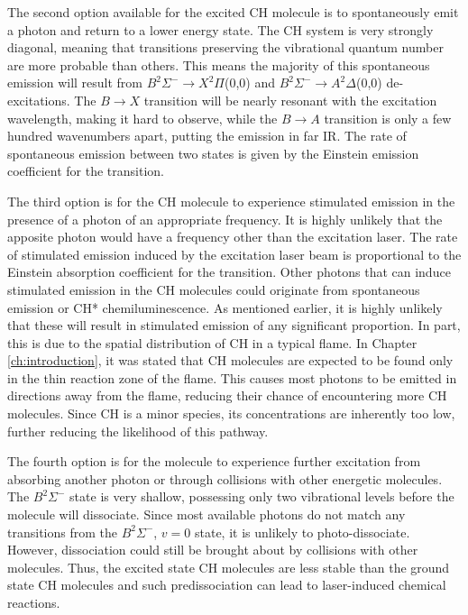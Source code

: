 The second option available for the excited CH molecule is to spontaneously emit a photon and return to a lower energy state.
The CH system is very strongly diagonal, meaning that transitions preserving the vibrational quantum number are more probable than others.
This means the majority of this spontaneous emission will result from \(B^2\Sigma^-\rightarrow X^2\Pi\)(0,0) and \(B^2\Sigma^-\rightarrow A^2\Delta\)(0,0) de-excitations.
The \(B\rightarrow X\) transition will be nearly resonant with the excitation wavelength, making it hard to observe, while the \(B\rightarrow A\) transition is only a few hundred wavenumbers apart, putting the emission in far IR.
The rate of spontaneous emission between two states is given by the Einstein emission coefficient for the transition.

The third option is for the CH molecule to experience stimulated emission in the presence of a photon of an appropriate frequency.
It is highly unlikely that the apposite photon would have a frequency other than the excitation laser.
The rate of stimulated emission induced by the excitation laser beam is proportional to the Einstein absorption coefficient for the transition.
Other photons that can induce stimulated emission in the CH molecules could originate from spontaneous emission or CH* chemiluminescence.
As mentioned earlier, it is highly unlikely that these will result in stimulated emission of any significant proportion.
In part, this is due to the spatial distribution of CH in a typical flame.
In Chapter \ref{ch:introduction}, it was stated that CH molecules are expected to be found only in the thin reaction zone of the flame.
This causes most photons to be emitted in directions away from the flame, reducing their chance of encountering more CH molecules.
Since CH is a minor species, its concentrations are inherently too low, further reducing the likelihood of this pathway.

The fourth option is for the molecule to experience further excitation from absorbing another photon or through collisions with other energetic molecules.
The \(B^2\Sigma^-\) state is very shallow, possessing only two vibrational levels before the molecule will dissociate.
Since most available photons do not match any transitions from the \(B^2\Sigma^-\), \(v=0\) state, it is unlikely to photo-dissociate.
However, dissociation could still be brought about by collisions with other molecules.
Thus, the excited state CH molecules are less stable than the ground state CH molecules and such predissociation can lead to laser-induced chemical reactions.

